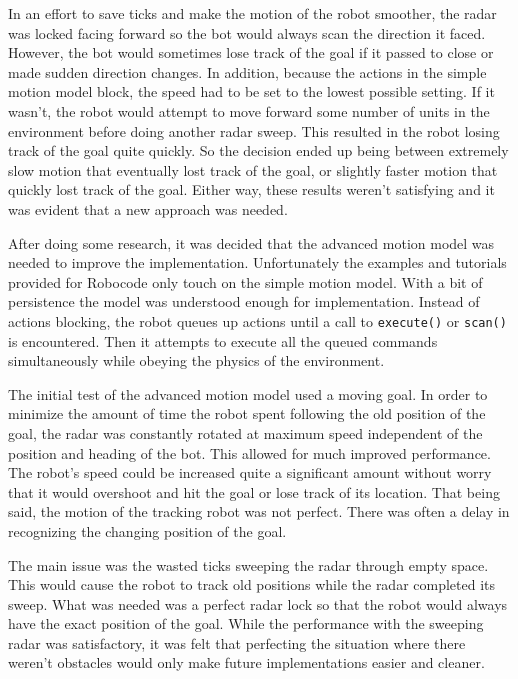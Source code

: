 \documentclass{aiaa-tc}%
\begin{document}
In an effort to save ticks and make the motion of the robot smoother, the radar was locked facing forward so the bot would always scan the direction it faced. However, the bot would sometimes lose track of the goal if it passed to close or made sudden direction changes. In addition, because the actions in the simple motion model block, the speed had to be set to the lowest possible setting. If it wasn't, the robot would attempt to move forward some number of units in the environment before doing another radar sweep. This resulted in the robot losing track of the goal quite quickly. So the decision ended up being between extremely slow motion that eventually lost track of the goal, or slightly faster motion that quickly lost track of the goal. Either way, these results weren't satisfying and it was evident that a new approach was needed.

After doing some research, it was decided that the advanced motion model was needed to improve the implementation. Unfortunately the examples and tutorials provided for Robocode only touch on the simple motion model. With a bit of persistence the model was understood enough for implementation. Instead of actions blocking, the robot queues up actions until a call to \verb|execute()| or \verb|scan()| is encountered. Then it attempts to execute all the queued commands simultaneously while obeying the physics of the environment. 

The initial test of the advanced motion model used a moving goal. In order to minimize the amount of time the robot spent following the old position of the goal, the radar was constantly rotated at maximum speed independent of the position and heading of the bot. This allowed for much improved performance. The robot's speed could be increased quite a significant amount without worry that it would overshoot and hit the goal or lose track of its location. That being said, the motion of the tracking robot was not perfect. There was often a delay in recognizing the changing position of the goal. 

The main issue was the wasted ticks sweeping the radar through empty space. This would cause the robot to track old positions while the radar completed its sweep. What was needed was a perfect radar lock so that the robot would always have the exact position of the goal. While the performance with the sweeping radar was satisfactory, it was felt that perfecting the situation where there weren't obstacles would only make future implementations easier and cleaner.
\end{document}
